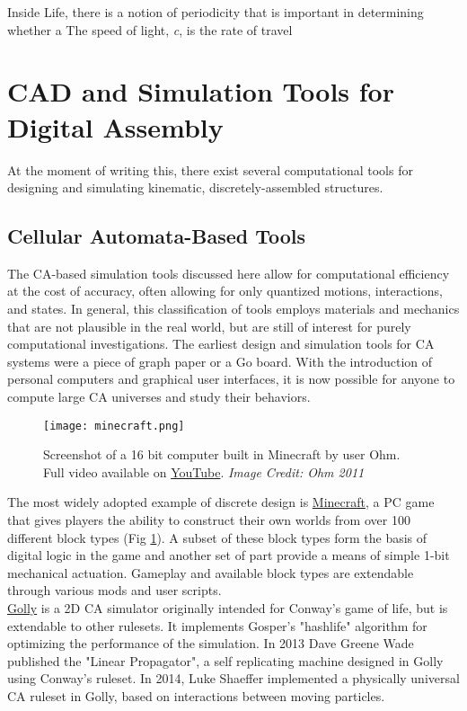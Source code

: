 {Inside Life, there is a notion of periodicity that is important in determining whether a 
The speed of light, \textit{c}, is the rate of travel 

\section{CAD and Simulation Tools for Digital Assembly}

At the moment of writing this, there exist several computational tools for designing and simulating kinematic, discretely-assembled structures.

\subsection{Cellular Automata-Based Tools}

The CA-based simulation tools discussed here allow for computational efficiency at the cost of accuracy, often allowing for only quantized motions, interactions, and states.  In general, this classification of tools employs materials and mechanics that are not plausible in the real world, but are still of interest for purely computational investigations.  The earliest design and simulation tools for CA systems were a piece of graph paper or a Go board\cite{Gardner1970}.  With the introduction of personal computers and graphical user interfaces, it is now possible for anyone to compute large CA universes and study their behaviors.\\

\begin{figure}
  \texttt{[image: minecraft.png]}
  \caption{Screenshot of a 16 bit computer built in Minecraft by user Ohm.  Full video available on \href{https://www.youtube.com/watch?v=KzrFzkb3A4o}{YouTube}. \textit{Image Credit: Ohm 2011}}
  \label{fig:minecraft}
\end{figure}

The most widely adopted example of discrete design is \href{https://minecraft.net/}{Minecraft}, a PC game that gives players the ability to construct their own worlds from over 100 different block types (Fig \ref{fig:minecraft}).  A subset of these block types form the basis of digital logic in the game and another set of part provide a means of simple 1-bit mechanical actuation\cite{MinecraftWik2016}.  Gameplay and available block types are extendable through various mods and user scripts.
\\

\href{http://golly.sourceforge.net/}{Golly} is a 2D CA simulator originally intended for Conway's game of life, but is extendable to other rulesets.  It implements Gosper's "hashlife" algorithm for optimizing the performance of the simulation\cite{Gosper1984}.  In 2013 Dave Greene Wade published the "Linear Propagator", a self replicating machine designed in Golly using Conway's ruleset\cite{Greene2013a}.  In 2014, Luke Shaeffer implemented a physically universal CA ruleset in Golly, based on interactions between moving particles\cite{Shaffer2014}.\\

}

